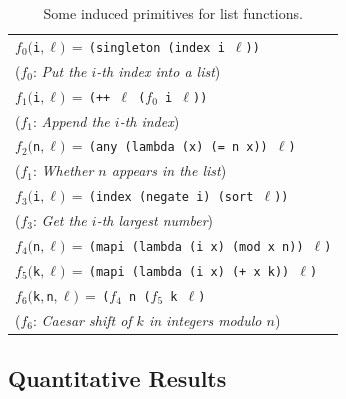 \documentclass{article}
\newcommand{\code}[1]{{\footnotesize\texttt{#1}}}
\begin{document}
\begin{table}[t]
  \centering
  \begin{tabular}{l}
    \toprule
    $f_0($\code{i$,\ell$}$) \,=\, $\code{(singleton (index i $\ell$))}\\
    \hspace{0.5cm}($f_0$: \emph{Put the $i$-th index into a list})\\
    $f_1($\code{i$,\ell$}$) \,=\, $\code{(++ $\ell$ ($f_0$ i $\ell$))}\\
    \hspace{0.5cm}($f_1$: \emph{Append the $i$-th index})\\
    $f_2($\code{n$,\ell$}$) \,=\, $\code{(any (lambda (x) (= n x)) $\ell$)}\\
    \hspace{0.5cm}($f_1$: \emph{Whether $n$ appears in the list})\\
    $f_3($\code{i$,\ell$}$) \,=\, $\code{(index (negate i) (sort $\ell$))}\\
    \hspace{0.5cm}($f_3$: \emph{Get the $i$-th largest number})\\
    $f_4($\code{n$,\ell$}$) \,=\, $\code{(mapi (lambda (i x) (mod x n)) $\ell$)}\\
    $f_5($\code{k$,\ell$}$) \,=\, $\code{(mapi (lambda (i x) (+ x k)) $\ell$)}\\
    $f_6($\code{k$,$n$,\ell$}$) \,=\, $\code{($f_4$ n ($f_5$ k $\ell$)}\\
    \hspace{0.5cm}($f_6$: \emph{Caesar shift of $k$ in integers modulo $n$})\\
  \bottomrule
  \end{tabular}
  \caption{Some induced primitives for list functions.}\label{listinduced}
\end{table}


\subsection{Quantitative Results}\label{quantitative}
\end{document}
